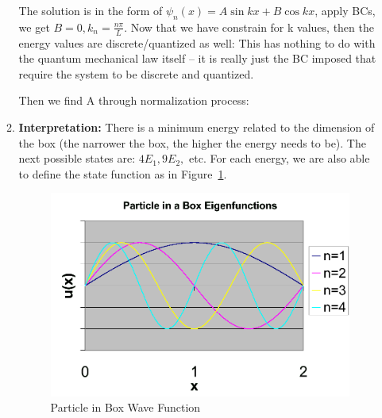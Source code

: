 \documentclass{school-22.101-notes}
\begin{document}
\begin{enumerate}
\begin{enumerate}
    The solution is in the form of $\psi_n (x) = A \sin kx + B \cos kx$, apply BCs, we get $B=0, k_n = \frac{n \pi}{L} $. Now that we have constrain for k values, then the energy values are discrete/quantized as well: 
    This has nothing to do with the quantum mechanical law itself -- it is really just the BC imposed that require the system to be discrete and quantized. 
    
    Then we find A through normalization process:
    
  
  \item \textbf{Interpretation:} There is a minimum energy related to the dimension of the box (the narrower the box, the higher the energy needs to be). The next possible states are: $4E_1, 9E_2,$ etc. For each energy, we are also able to define the state function as in Figure~\ref{particle-in-box}.
  \begin{figure}
    \centering
    \includegraphics[width=4in]{images/qm/1Dparticle-in-box.png}
    \caption{Particle in Box Wave Function\label{particle-in-box}}
  \end{figure}

  \end{enumerate}
\end{enumerate}
\end{document}
